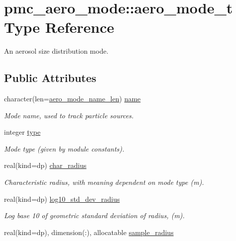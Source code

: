 \hypertarget{structpmc__aero__mode_1_1aero__mode__t}{}\section{pmc\+\_\+aero\+\_\+mode\+:\+:aero\+\_\+mode\+\_\+t Type Reference}
\label{structpmc__aero__mode_1_1aero__mode__t}


An aerosol size distribution mode.  


\subsection*{Public Attributes}
\begin{DoxyCompactItemize}
\item 
character(len=\mbox{\hyperlink{namespacepmc__aero__mode_ae84b8139739f7f4a21f52621b68f8b3b}{aero\+\_\+mode\+\_\+name\+\_\+len}}) \mbox{\hyperlink{structpmc__aero__mode_1_1aero__mode__t_abed615c819c004f8c8d9a3c6344ee1bb}{name}}
\begin{DoxyCompactList}\small\item\em Mode name, used to track particle sources. \end{DoxyCompactList}\item 
integer \mbox{\hyperlink{structpmc__aero__mode_1_1aero__mode__t_a98bd0880e3031493eba1c08644bef788}{type}}
\begin{DoxyCompactList}\small\item\em Mode type (given by module constants). \end{DoxyCompactList}\item 
real(kind=dp) \mbox{\hyperlink{structpmc__aero__mode_1_1aero__mode__t_a06669595ee6345caf6b7b4c39aa91fd6}{char\+\_\+radius}}
\begin{DoxyCompactList}\small\item\em Characteristic radius, with meaning dependent on mode type (m). \end{DoxyCompactList}\item 
real(kind=dp) \mbox{\hyperlink{structpmc__aero__mode_1_1aero__mode__t_a365f9259ec7d4dd6c5a263b4f705b8e0}{log10\+\_\+std\+\_\+dev\+\_\+radius}}
\begin{DoxyCompactList}\small\item\em Log base 10 of geometric standard deviation of radius, (m). \end{DoxyCompactList}\item 
real(kind=dp), dimension(\+:), allocatable \mbox{\hyperlink{structpmc__aero__mode_1_1aero__mode__t_abe8c0d5e3a49d9da93fb1b0b5d3c3dd0}{sample\+\_\+radius}}

\end{DoxyCompactItemize}
